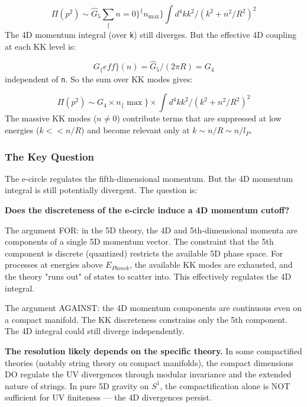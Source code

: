 \documentclass[aps,prd,preprint,superscriptaddress,longbibliography,floatfix]{revtex4-2}
\theoremstyle{remark}
\begin{document}
\begin{equation}
    \Pi(p^{2}) \sim  \hat{G}_{5} \sum_\{n=0\}^\{n_{\max}\} \int d^{4}k k^{2} / (k^{2} + n^{2}/R^{2})^{2}
\end{equation}
The 4D momentum integral (over \texttt{k}) still diverges. But the effective 4D coupling at each KK level is:


\begin{equation}
    G_\{eff\}(n) = \hat{G}_{5} / (2\pi R) = G_{4}
\end{equation}
independent of \texttt{n}. So the sum over KK modes gives:


\begin{equation}
    \Pi(p^{2}) \sim  G_{4} \times n_\{\max\} \times \int d^{4}k k^{2} / (k^{2} + n^{2}/R^{2})^{2}
\end{equation}
The massive KK modes ($n \neq 0$) contribute terms that are suppressed at low energies ($k << n/R$) and become relevant only at $k \sim  n/R \sim  n/l_P$.


\subsubsection{The Key Question}

The e-circle regulates the fifth-dimensional momentum. But the 4D momentum integral is still potentially divergent. The question is:

\textbf{Does the discreteness of the e-circle induce a 4D momentum cutoff?}

The argument FOR: in the 5D theory, the 4D and 5th-dimensional momenta are components of a single 5D momentum vector. The constraint that the 5th component is discrete (quantized) restricts the available 5D phase space. For processes at energies above $E_{Planck}$, the available KK modes are exhausted, and the theory "runs out" of states to scatter into. This effectively regulates the 4D integral.

The argument AGAINST: the 4D momentum components are continuous even on a compact manifold. The KK discreteness constrains only the 5th component. The 4D integral could still diverge independently.

\textbf{The resolution likely depends on the specific theory.} In some compactified theories (notably string theory on compact manifolds), the compact dimensions DO regulate the UV divergences through modular invariance and the extended nature of strings. In pure 5D gravity on $S^{1}$, the compactification alone is NOT sufficient for UV finiteness --- the 4D divergences persist.
\end{document}
